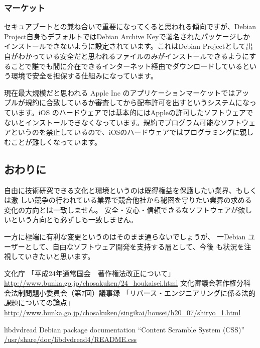 \documentclass[mingoth,a4paper]{jsarticle}
\begin{document}
\subsubsection{マーケット}

セキュアブートとの兼ね合いで重要になってくると思われる傾向ですが、Debian
Project自身もデフォルトではDebian Archive Keyで署名されたパッケージしか
インストールできないように設定されています。これはDebian Projectとして出
自がわかっている安全だと思われるファイルのみがインストールできるようにす
ることで誰でも間に介在できるインターネット経由でダウンロードしているとい
う環境で安全を担保する仕組みになっています。

現在最大規模だと思われる Apple Inc のアプリケーションマーケットではアッ
プルが規約に合致しているか審査してから配布許可を出すというシステムになっ
ています。iOS のハードウェアでは基本的にはAppleの許可したソフトウェアで
ないとインストールできなくなっています。規約でプログラム可能なソフトウェ
アというのを禁止しているので、iOSのハードウェアではプログラミングに親し
むことが難しくなっています。

\subsection{おわりに}

自由に技術研究できる文化と環境というのは既得権益を保護したい業界、もしくは激
しい競争の行われている業界で競合他社から秘密を守りたい業界の求める
変化の方向とは一致しません。
安全・安心・信頼できるなソフトウェアが欲しいという方向とも必ずしも一致しません。

一方に極端に有利な変更というのはそのまま通らないでしょうが、
一Debian ユーザーとして、自由なソフトウェア開発を支持する層として、今後
も状況を注視していきたいと思います。


\begin{thebibliography}{99}
	 文化庁 「平成24年通常国会　著作権法改正について」
	 \url{http://www.bunka.go.jp/chosakuken/24_houkaisei.html}
	 文化審議会著作権分科会法制問題小委員会（第7回）議事録
	 「リバース・エンジニアリングに係る法的課題についての論点」
 \url{http://www.bunka.go.jp/chosakuken/singikai/housei/h20_07/shiryo_1.html}

	 libdvdread Debian package documentation
	 ``Content Scramble System (CSS)''
	 \url{/usr/share/doc/libdvdread4/README.css}

\end{thebibliography}
\end{document}
